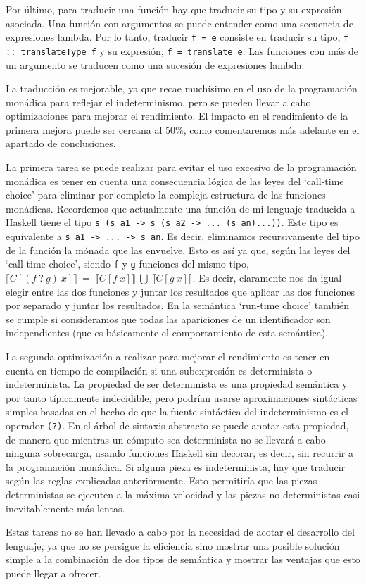 \documentclass[class=article, crop=false]{standalone}
\begin{document}
Por último, para traducir una función hay que traducir su tipo y su expresión asociada.
Una función con argumentos se puede entender como una secuencia de expresiones lambda. Por
lo tanto, traducir \verb`f = e` consiste en traducir su tipo, \verb`f :: translateType f` y
su expresión, \verb`f = translate e`. Las funciones con más de un argumento se traducen como
una sucesión de expresiones lambda.

La traducción es mejorable, ya que recae muchísimo en el uso de la programación monádica
para reflejar el indeterminismo, pero se pueden llevar a cabo optimizaciones para mejorar
el rendimiento. El impacto en el rendimiento de la primera mejora puede ser cercana al 50\%,
como comentaremos más adelante en el apartado de conclusiones.

La primera tarea se puede realizar para evitar el uso excesivo de la programación monádica
es tener en cuenta una consecuencia lógica de las leyes del `call-time choice' para eliminar
por completo la compleja estructura de las funciones monádicas. Recordemos que actualmente
una función de mi lenguaje traducida a Haskell tiene el tipo
\verb`s (s a1 -> s (s a2 -> ... (s an)...))`. Este tipo es equivalente a
\verb`s a1 -> ... -> s an`. Es decir, eliminamos recursivamente del tipo de la función la
mónada que las envuelve. Esto es así ya que, según las leyes del `call-time choice', siendo
\verb`f` y \verb`g` funciones del mismo tipo, $\llbracket C[(f \: ? \: g) \: x]\rrbracket
\: = \: \llbracket C[f \: x]\rrbracket \: \bigcup \: \llbracket C[g \: x]\rrbracket$. Es
decir, claramente nos da igual elegir entre las dos funciones y juntar los resultados que
aplicar las dos funciones por separado y juntar los resultados. En la semántica
`run-time choice' también se cumple si consideramos que todas las apariciones de un
identificador son  independientes (que es básicamente el comportamiento de esta semántica).

La segunda optimización a realizar para mejorar el rendimiento es tener en cuenta en tiempo
de compilación si una subexpresión es determinista o indeterminista. La propiedad de ser
determinista es una propiedad semántica y por tanto típicamente indecidible, pero podrían
usarse aproximaciones sintácticas simples basadas en el hecho de que la fuente sintáctica
del indeterminismo es el operador \verb`(?)`. En el árbol de sintaxis abstracto se puede
anotar esta propiedad, de manera que mientras un cómputo sea determinista no se llevará a
cabo ninguna sobrecarga, usando funciones Haskell sin decorar, es decir, sin recurrir a la
programación monádica. Si alguna pieza es indeterminista, hay que traducir según las reglas
explicadas anteriormente. Esto permitiría que las piezas deterministas se ejecuten a la
máxima velocidad y las piezas no deterministas casi inevitablemente más lentas.

Estas tareas no se han llevado a cabo por la necesidad de acotar el desarrollo del lenguaje,
ya que no se persigue la eficiencia sino mostrar una posible solución simple a la combinación
de dos tipos de semántica y mostrar las ventajas que esto puede llegar a ofrecer.
\end{document}
